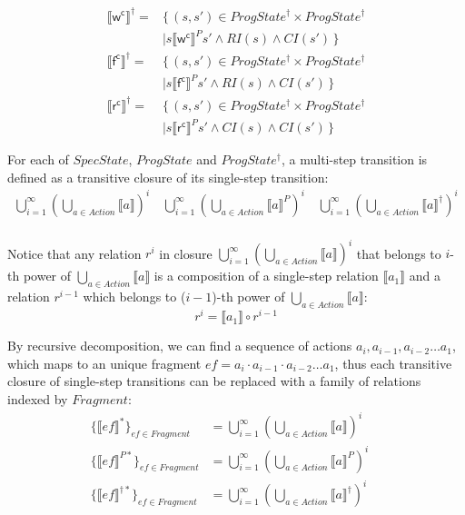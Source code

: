 \documentclass[a4paper,11pt]{article}
\theoremstyle{definition}
\begin{document}
\begin{align*}
	\llbracket \mathsf {w^c} \rrbracket^\dagger ={}& \{\, (s, s') \in ProgState^\dagger \times ProgState^\dagger\\ &\mid s \llbracket \mathsf {w^c} \rrbracket^P s' \land \mathit{RI(s)} \land \mathit{CI(s')} \,\} \\
	\llbracket \mathsf {f^c} \rrbracket^\dagger ={}& \{\, (s, s') \in ProgState^\dagger \times ProgState^\dagger\\ &\mid s \llbracket \mathsf {f^c} \rrbracket^P s' \land \mathit{RI(s)} \land \mathit{CI(s')} \,\} \\
	\llbracket \mathsf {r^c} \rrbracket^\dagger ={}& \{\, (s, s') \in ProgState^\dagger \times ProgState^\dagger\\ &\mid s \llbracket \mathsf {r^c} \rrbracket^P s' \land \mathit{CI(s)} \land \mathit{CI(s')} \,\} 
\end{align*}

For each of $\mathit{SpecState}$, $\mathit{ProgState}$ and $\mathit{ProgState^\dagger}$, a multi-step transition is defined as a transitive closure of its single-step transition:
\begin{align*}
	\bigcup_{i=1}^\infty\left(\bigcup_{a \in Action} \llbracket a \rrbracket \right)^i \quad
	\bigcup_{i=1}^\infty\left(\bigcup_{a \in Action} \llbracket a \rrbracket^P \right)^i \quad
	\bigcup_{i=1}^\infty\left(\bigcup_{a \in Action} \llbracket a \rrbracket^\dagger \right)^i \\
\end{align*}

Notice that any relation $r^i$ in closure $\bigcup_{i=1}^\infty\left(\bigcup_{a \in Action} \llbracket a \rrbracket \right)^i$ that belongs to $i$-th power of $\bigcup_{a \in Action} \llbracket a \rrbracket$ is a composition of a single-step relation $\llbracket a_1 \rrbracket$ and a relation $r^{i-1}$ which belongs to (${i-1}$)-th power of $\bigcup_{a \in Action} \llbracket a \rrbracket$:
$$r^i = \llbracket a_1 \rrbracket \circ r^{i-1}$$

By recursive decomposition, we can find a sequence of actions $a_i, a_{i-1}, a_{i-2} \dots a_1$, which maps to an unique fragment $\mathit{ef} = a_i \cdot a_{i-1} \cdot a_{i-2} \dots a_1$, thus each transitive closure of single-step transitions can be replaced with a family of relations indexed by $\mathit {Fragment}$:
\begin{align*}
	\{ \llbracket \mathit{ef} \rrbracket^* \}_\mathit{ef \in Fragment} &= 
	\bigcup_{i=1}^\infty\left(\bigcup_{a \in Action} \llbracket a \rrbracket \right)^i \quad\\
	\{ \llbracket \mathit{ef} \rrbracket^{P*} \}_\mathit{ef \in Fragment} &= 
	\bigcup_{i=1}^\infty\left(\bigcup_{a \in Action} \llbracket a \rrbracket^P \right)^i \quad\\
	\{ \llbracket \mathit{ef} \rrbracket^{\dagger*} \}_\mathit{ef \in Fragment} &= 
	\bigcup_{i=1}^\infty\left(\bigcup_{a \in Action} \llbracket a \rrbracket^\dagger \right)^i
\end{align*}
\end{document}
